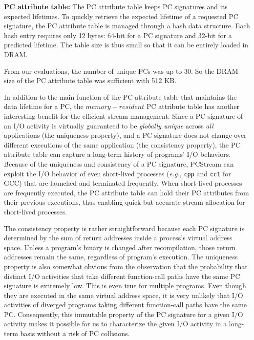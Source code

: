 \textbf{PC attribute table:}
The PC attribute table keeps PC signatures and its expected lifetimes. To
quickly retrieve the expected lifetime of a requested PC signature, the PC
attribute table is managed through a hash data structure. Each hash entry
requires only 12 bytes: 64-bit for a PC signature and 32-bit for a predicted
lifetime.  The table size is thus small so that it can be entirely loaded
in DRAM.   
{{\color{blue} From our evaluations, the number of unique PCs was up to 30.
So the DRAM size of the PC attribute table was
sufficient with 512 KB.
}

In addition to the main function of the PC attribute table that maintains the
data lifetime for a PC, the $memory-resident$ PC attribute table has another
interesting benefit for the efficient stream management.  Since a PC
signature of an I/O activity is virtually guaranteed to be {\it globally unique} across
{\it all} applications (the uniqueness property), and a PC signature does not change
over different executions of the same application (the consistency property), the PC
attribute table can capture a long-term history of programs' I/O behaviors.
Because of the uniqueness and consistency of a PC signature, \textsf{\small PCStream}
can exploit the I/O behavior of even short-lived processes ({\it e.g.}, \texttt{cpp}
and \texttt{cc1} for GCC)  that are launched and terminated frequently.  When
short-lived processes are frequently executed, the PC attribute table can hold
their PC attributes from their previous executions, thus enabling quick but
accurate stream allocation for short-lived processes.

The consistency property is rather straightforward because each PC signature is
determined by the sum of return addresses inside a process's virtual address
space.  Unless a program's binary is changed after recompilation, those return
addresses remain the same, regardless of program's execution.  The uniqueness property 
is also somewhat obvious from the observation that the probability that
distinct I/O activities that take different function-call paths have the same
PC signature is extremely low. This is even true for multiple programs. Even
though they are executed in the same virtual address space, it is very unlikely
that I/O activities of diverged programs taking different function-call paths
have the same PC.  Consequently, this immutable property of the PC signature
for a given I/O activity makes it possible for us to characterize the given I/O
activity in a long-term basis without a risk of PC collisions.

}
